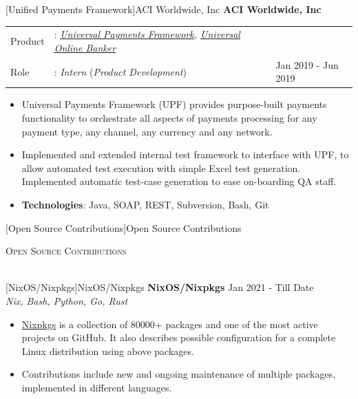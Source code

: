 \documentclass[a4paper]{article}
\newcommand{\lineunder} {
    \vspace*{-8pt} \\
    \hspace*{-18pt} \hrulefill \\
}
\newcommand{\header} [1] {
    {\hspace*{-18pt}\vspace*{6pt} \textsc{#1}}
    \vspace*{-6pt} \lineunder
}
\begin{document}

[Unified Payments Framework]{ACI Worldwide, Inc}
\textbf{ACI Worldwide, Inc} \\
\begin{tabularx}{\textwidth}{ l l>{\raggedleft\arraybackslash}X}
	Product & : \textit{\href{https://www.aciworldwide.com/solutions/payments-orchestration-platform}{Universal Payments Framework}, \href{https://dragonflyft.com/product}{Universal Online Banker}} &                     \\
	Role    & : \textit{Intern} (\textit{Product Development})                                                                                                                                        & Jan 2019 - Jun 2019 \\
\end{tabularx}
\begin{itemize} \itemsep 1pt
	\item Universal Payments Framework (UPF) provides purpose-built payments functionality to orchestrate all aspects of payments processing for any payment type, any channel, any currency and any network.
	\item Implemented and extended internal test framework to interface with UPF, to allow automated test execution with simple Excel test generation. Implemented automatic test-case generation to ease on-boarding QA staff.
	\item \textbf{Technologies}: Java, SOAP, REST, Subversion, Bash, Git
\end{itemize}
\vspace{1mm}

[Open Source Contributions]{Open Source Contributions}
\header{Open Source Contributions}
\vspace{1mm}

[NixOS/Nixpkgs]{NixOS/Nixpkgs}
{\textbf{NixOS/Nixpkgs}} \hfill Jan 2021 - Till Date \\
\textit{Nix, Bash, Python, Go, Rust} \\
\begin{itemize}
	\item \href{https://github.com/NixOS/nixpkgs/}{Nixpkgs} is a collection of 80000+ packages and one of the most active projects on GitHub. It also describes possible configuration for a complete Linux distribution using above packages.
	\item Contributions include new and ongoing maintenance of multiple packages, implemented in different languages.
\end{itemize}
\end{document}
